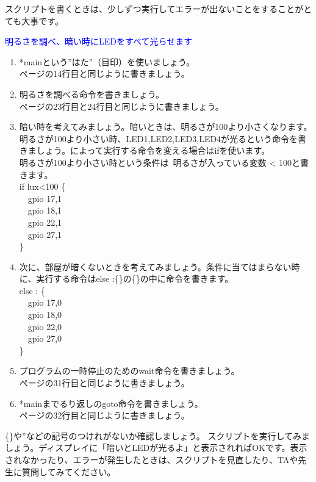 \documentclass[text03.tex]{subfiles}
\begin{document}
\begin{enumerate}
\begin{enumerate}
スクリプトを書くときは、少しずつ実行してエラーが出ないことをすることがとても大事です。
\end{enumerate}
\textcolor{blue}{\item 明るさを調べ、暗い時にLEDをすべて光らせます}
\begin{enumerate}
\item *mainという”はた”（目印）を使いましょう。\\
\pageref{sensors.hsp}ページの14行目と同じように書きましょう。
\item 明るさを調べる命令を書きましょう。\\
\pageref{sensors.hsp}ページの23行目と24行目と同じように書きましょう。
\item 暗い時を考えてみましょう。暗いときは、明るさが100より小さくなります。
明るさが100より小さい時、LED1,LED2,LED3,LED4が光るという命令を書きましょう。によって実行する命令を変える場合はifを使います。\\
明るさが100より小さい時という条件は\ 明るさが入っている変数 < 100と書きます。\\
if lux<100 \{\\
\ \ gpio 17,1\\
\ \ gpio 18,1\\
\ \ gpio 22,1\\
\ \ gpio 27,1\\
\}
\item 次に、部屋が暗くないときを考えてみましょう。条件に当てはまらない時に、実行する命令はelse :\{\}の\{\}の中に命令を書きます。\\
else : \{\\
\ \ gpio 17,0\\
\ \ gpio 18,0\\
\ \ gpio 22,0\\
\ \ gpio 27,0\\
\}
\item プログラムの一時停止のためのwait命令を書きましょう。\\
\pageref{sensors.hsp}ページの31行目と同じように書きましょう。
\item *mainまでるり返しのgoto命令を書きましょう。\\
\pageref{sensors.hsp}ページの32行目と同じように書きましょう。
\end{enumerate}
\item  \{\}や”などの記号のつけれがないか確認しましょう。
スクリプトを実行してみましょう。ディスプレイに「暗いとLEDが光るよ」と表示されればOKです。表示されなかったり、エラーが発生したときは、スクリプトを見直したり、TAや先生に質問してみてください。
\end{enumerate}

\begin{tcolorbox}[title=\useOmetoi]
    \begin{enumerate}
    \end{enumerate}
\end{tcolorbox}
\end{document}
